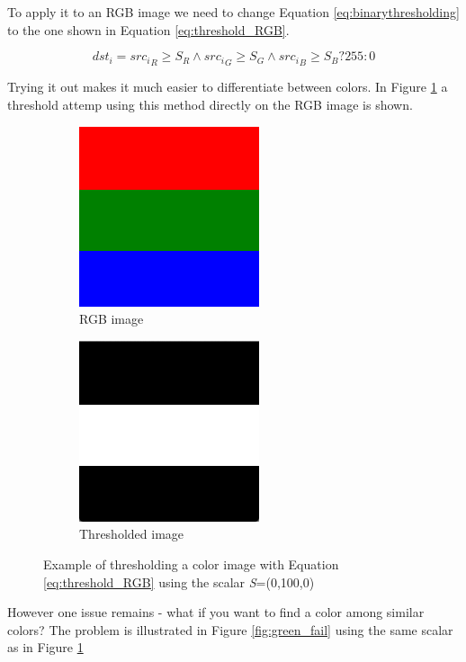 To apply it to an RGB image we need to change Equation \ref{eq:binarythresholding} to the one shown in Equation \ref{eq:threshold_RGB}.

\begin{equation}
{dst_i} = {src_i}_R \geq S_R \wedge {src_i}_G \geq S_G \wedge {src_i}_B \geq S_B? 255: 0
\label{eq:threshold_RGB}
\end{equation}

Trying it out makes it much easier to differentiate between colors. In Figure \ref{fig:RGB_Thresh} a threshold attemp using this method directly on the RGB image is shown.

\begin{figure}
        \centering
        \begin{subfigure}[b]{0.3\textwidth}
                \includegraphics[scale=0.5]{img/RGB}
                \caption{RGB image}
        \end{subfigure}
		\quad
        \begin{subfigure}[b]{0.3\textwidth}
                \includegraphics[scale=0.5]{img/RGBThresh}
                \caption{Thresholded image}
        \end{subfigure}
		\caption{Example of thresholding a color image with Equation \ref{eq:threshold_RGB} using the scalar \textit{S}=(0,100,0)}
		\label{fig:RGB_Thresh}
\end{figure}

However one issue remains - what if you want to find a color among similar colors? The problem is illustrated in Figure \ref{fig:green_fail} using the same scalar as in Figure \ref{fig:RGB_Thresh}

